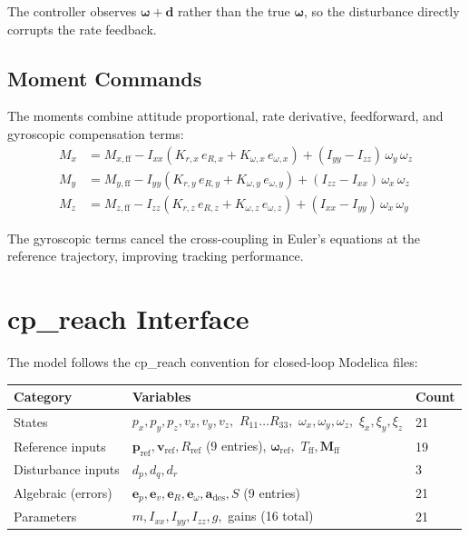 \documentclass[11pt]{article}
\begin{document}
The controller observes $\bm{\omega} + \bm{d}$ rather than the true
$\bm{\omega}$, so the disturbance directly corrupts the rate feedback.

\subsection{Moment Commands}

The moments combine attitude proportional, rate derivative, feedforward,
and gyroscopic compensation terms:
\begin{align}
  M_x &= M_{x,\mathrm{ff}}
         - I_{xx}(K_{r,x}\,e_{R,x} + K_{\omega,x}\,e_{\omega,x})
         + (I_{yy} - I_{zz})\,\omega_y\,\omega_z \\
  M_y &= M_{y,\mathrm{ff}}
         - I_{yy}(K_{r,y}\,e_{R,y} + K_{\omega,y}\,e_{\omega,y})
         + (I_{zz} - I_{xx})\,\omega_x\,\omega_z \\
  M_z &= M_{z,\mathrm{ff}}
         - I_{zz}(K_{r,z}\,e_{R,z} + K_{\omega,z}\,e_{\omega,z})
         + (I_{xx} - I_{yy})\,\omega_x\,\omega_y
\end{align}

The gyroscopic terms cancel the cross-coupling in Euler's equations at
the reference trajectory, improving tracking performance.

\section{cp\_reach Interface}

The model follows the cp\_reach convention for closed-loop Modelica
files:

\begin{center}
\begin{tabular}{lll}
  \textbf{Category} & \textbf{Variables} & \textbf{Count} \\
  \hline
  States & $p_x, p_y, p_z, v_x, v_y, v_z,$
           $R_{11}\ldots R_{33},$
           $\omega_x, \omega_y, \omega_z,$
           $\xi_x, \xi_y, \xi_z$ & 21 \\[2pt]
  Reference inputs & $\bm{p}_\mathrm{ref}, \bm{v}_\mathrm{ref},
           R_\mathrm{ref}$ (9 entries),
           $\bm{\omega}_\mathrm{ref},$
           $T_\mathrm{ff}, \bm{M}_\mathrm{ff}$ & 19 \\[2pt]
  Disturbance inputs & $d_p, d_q, d_r$ & 3 \\[2pt]
  Algebraic (errors) & $\bm{e}_p, \bm{e}_v, \bm{e}_R, \bm{e}_\omega,
           \bm{a}_\mathrm{des}, S$ (9 entries) & 21 \\[2pt]
  Parameters & $m, I_{xx}, I_{yy}, I_{zz}, g,$
               gains (16 total) & 21 \\
\end{tabular}
\end{center}
\end{document}
